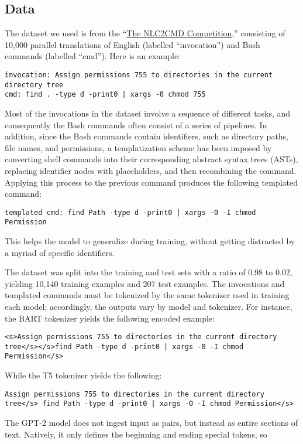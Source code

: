 \subsection{Data}
The dataset we used is from the
``\href{https://nlc2cmd.us-east.mybluemix.net/}{The NLC2CMD Competition},''
consisting of 10,000 parallel translations of English (labelled
``invocation'') and Bash commands (labelled ``cmd''). Here is an example:
\begin{verbatim}
invocation: Assign permissions 755 to directories in the current directory tree
cmd: find . -type d -print0 | xargs -0 chmod 755
\end{verbatim}
Most of the invocations in the dataset involve a sequence of different tasks,
and consequently the Bash commands often consist of a series of pipelines. In
addition, since the Bash commands contain identifiers, such as directory paths,
file names, and permissions, a templatization scheme has been imposed by
converting shell commands into their corresponding abstract syntax trees
(ASTs), replacing identifier nodes with placeholders, and then recombining the
command. Applying this process to the previous command produces the following
templated command:
\begin{verbatim}
templated cmd: find Path -type d -print0 | xargs -0 -I chmod Permission
\end{verbatim}
This helps the model to generalize during training, without getting distracted
by a myriad of specific identifiers.
\par
The dataset was split into the training and test sets with a ratio of 0.98 to 0.02, yielding 10,140 training examples and 207 test examples. The invocations and templated commands must be tokenized by the same tokenizer used in training each model; accordingly, the outputs vary by model and tokenizer. For instance, the BART tokenizer yields the following encoded example:
\begin{verbatim}
<s>Assign permissions 755 to directories in the current directory 
tree</s></s>find Path -type d -print0 | xargs -0 -I chmod Permission</s>
\end{verbatim}
While the T5 tokenizer yields the following:
\begin{verbatim}
Assign permissions 755 to directories in the current directory 
tree</s> find Path -type d -print0 | xargs -0 -I chmod Permission</s>
\end{verbatim}
The GPT-2 model does not ingest input as pairs, but instead as entire sections of
text. Natively, it only defines the beginning and ending special tokens, so
